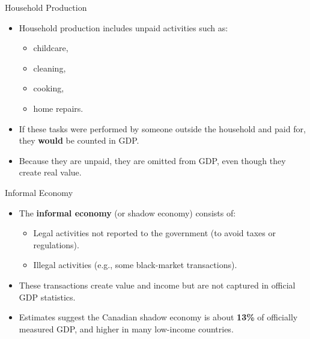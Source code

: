 \documentclass[aspectratio=169]{beamer}
\begin{document}
\begin{frame}{Household Production}
\transfade
\begin{itemize}[<+->]
  \item Household production includes unpaid activities such as:
  \begin{itemize}[<+->]
    \item childcare,
    \item cleaning,
    \item cooking,
    \item home repairs.
  \end{itemize}
  \item If these tasks were performed by someone outside the household and paid for, they \textbf{would} be counted in GDP.
  \item Because they are unpaid, they are \alert{omitted} from GDP, even though they create real value.
\end{itemize}
\end{frame}

\begin{frame}{Informal Economy}
\transfade
\begin{itemize}[<+->]
  \item The \textbf{informal economy} (or shadow economy) consists of:
  \begin{itemize}[<+->]
    \item Legal activities not reported to the government (to avoid taxes or regulations).
    \item Illegal activities (e.g., some black-market transactions).
  \end{itemize}
  \item These transactions create value and income but are not captured in official GDP statistics.
  \item Estimates suggest the Canadian shadow economy is about \textbf{13\%} of officially measured GDP, and higher in many low-income countries.
\end{itemize}
\end{frame}
\end{document}
